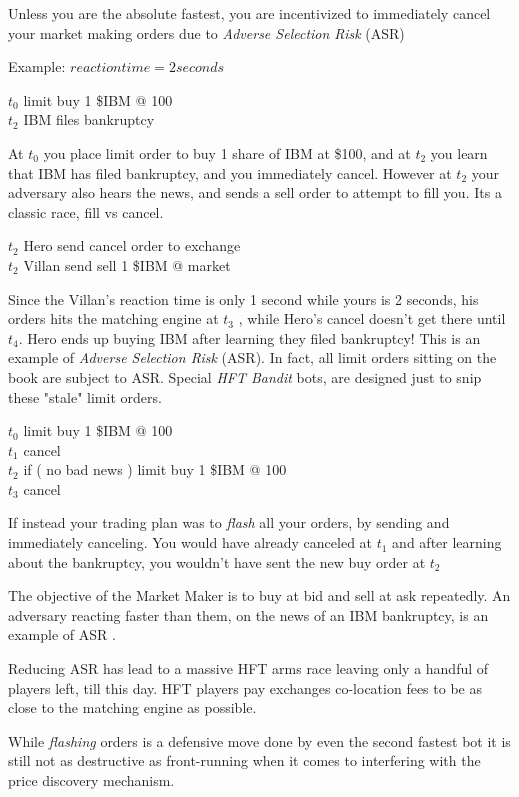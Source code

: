 \documentclass[12pt]{article}
\begin{document}
Unless you are the absolute fastest, you are incentivized to immediately cancel your market making orders due to \emph{Adverse Selection Risk } (ASR)  

Example: \( reaction time = 2 seconds \) 

$t_0$ limit buy 1 \$IBM @ 100 \\
$t_2$ IBM files bankruptcy 

At $t_0$ you place limit order to buy 1 share of IBM at \$100, and at $t_2$ you learn that IBM has filed bankruptcy, and you immediately cancel. However at $t_2$ your adversary also hears the news, and sends a sell order to attempt to fill you. Its a classic race, fill vs cancel.

$t_2$ Hero send cancel order to exchange  \\
$t_2$ Villan send sell 1 \$IBM @ market  

Since the Villan's reaction time is only 1 second while yours is 2 seconds, his orders hits the matching engine at $t_3$ , while Hero's cancel doesn't get there until $t_4$. Hero ends up buying IBM after learning they filed bankruptcy! This is an example of \emph{Adverse Selection Risk} (ASR). In fact, all limit orders sitting on the book are subject to ASR. Special \emph{HFT Bandit} bots, are designed just to snip these "stale" limit orders. 

$t_0$ limit buy 1 \$IBM @ 100 \\
$t_1$ cancel \\
$t_2$ if ( no bad news ) limit buy 1 \$IBM @ 100 \\
$t_3$ cancel 

If instead your trading plan was to \emph{flash} all your orders, by sending and immediately canceling. You would have already canceled at $t_1$ and after learning about the bankruptcy, you wouldn't have sent the new buy order at $t_2$

The objective of the Market Maker is to buy at bid and sell at ask repeatedly. An adversary reacting faster than them, on the news of an IBM bankruptcy, is an example of ASR . 

Reducing ASR has lead to a massive HFT arms race \cite{notsure} leaving only a handful of players left, till this day. HFT players pay exchanges co-location fees to be as close to the matching engine as possible. 

While \emph{flashing} orders is a defensive move done by even the second fastest bot it is still not as destructive as front-running when it comes to interfering with the price discovery mechanism. 
\end{document}
